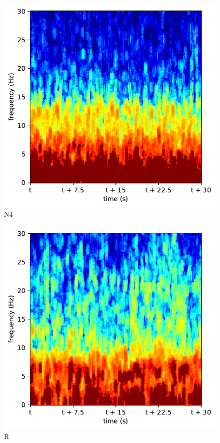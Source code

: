 \begin{subfigure}{.16\textwidth}
  \centering
  \includegraphics[width=1\linewidth]{./../Article/pics/class_clean_4}
  \caption{N4}
  \label{fig_1_15}
\end{subfigure}%
\begin{subfigure}{.16\textwidth}
  \centering
  \includegraphics[width=1\linewidth]{./../Article/pics/class_clean_5}
  \caption{R}
  \label{fig_1_16}
\end{subfigure}
